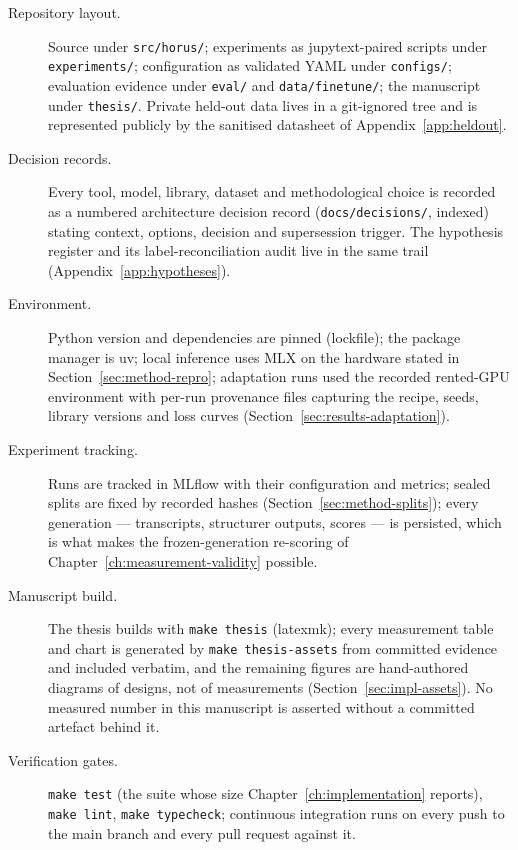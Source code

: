 \begin{description}
  \item[Repository layout.] Source under \texttt{src/horus/}; experiments as
        jupytext-paired scripts under \texttt{experiments/}; configuration as
        validated \ac{YAML} under \texttt{configs/}; evaluation evidence under
        \texttt{eval/} and \texttt{data/finetune/}; the manuscript under
        \texttt{thesis/}. Private held-out data lives in a git-ignored tree and is
        represented publicly by the sanitised datasheet of
        Appendix~\ref{app:heldout}.
  \item[Decision records.] Every tool, model, library, dataset and methodological
        choice is recorded as a numbered architecture decision record
        (\texttt{docs/decisions/}, indexed) stating context, options, decision and
        supersession trigger. The hypothesis register and its label-reconciliation
        audit live in the same trail (Appendix~\ref{app:hypotheses}).
  \item[Environment.] Python version and dependencies are pinned (lockfile);
        the package manager is uv; local inference uses \ac{MLX}
        \parencite{mlxvlm} on the hardware stated in Section~\ref{sec:method-repro};
        adaptation runs used the recorded rented-\ac{GPU} environment with
        per-run provenance files capturing the recipe, seeds, library versions and
        loss curves (Section~\ref{sec:results-adaptation}).
  \item[Experiment tracking.] Runs are tracked in MLflow with their configuration
        and metrics; sealed splits are fixed by recorded hashes
        (Section~\ref{sec:method-splits}); every generation --- transcripts, structurer
        outputs, scores --- is persisted, which is what makes the frozen-generation
        re-scoring of Chapter~\ref{ch:measurement-validity} possible.
  \item[Manuscript build.] The thesis builds with \texttt{make thesis}
        (latexmk); every measurement table and chart is generated by
        \texttt{make thesis-assets} from committed evidence and included verbatim,
        and the remaining figures are hand-authored diagrams of designs, not of
        measurements (Section~\ref{sec:impl-assets}). No measured number in this
        manuscript is asserted without a committed artefact behind it.
  \item[Verification gates.] \texttt{make test} (the suite whose size
        Chapter~\ref{ch:implementation} reports), \texttt{make lint},
        \texttt{make typecheck}; continuous integration runs on every push to the
        main branch and every pull request against it.
\end{description}
